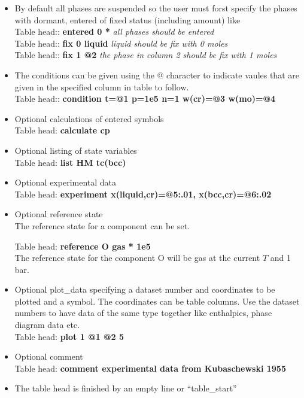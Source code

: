 \documentclass[12pt]{article}
\begin{document}
\begin{itemize}
\item By default all phases are suspended so the user must forst specify the
  phases with dormant, entered of fixed status (including amount) like\\
  Table head:: {\bf entered 0 *} {\em all phases should be entered}\\ 
  Table head:: {\bf fix 0 liquid} {\em liquid should be fix with 0 moles}\\ 
  Table head:: {\bf fix 1 @2} {\em the phase in column 2 should be fix
    with 1 moles}

\item The conditions can be given using the @ character to indicate vaules
  that are given in the specified column in table to follow.\\
  Table head:: {\bf condition t=@1 p=1e5 n=1 w(cr)=@3 w(mo)=@4 }

\item Optional calculations of entered symbols\\
  Table head: {\bf calculate cp}

\item Optional listing of state variables\\
  Table head: {\bf list HM tc(bcc)}

\item Optional experimental data\\
  Table head: {\bf experiment x(liquid,cr)=@5:.01, x(bcc,cr)=@6:.02}
      
\item Optional reference state\\
  The reference state for a component can be set.

  Table head: {\bf reference O gas * 1e5}\\ 
  The reference state for the component O will be gas at the current
  $T$ and 1 bar.

\item Optional plot\_data specifying a dataset number and coordinates
  to be plotted and a symbol.  The coordinates can be table columns.
  Use the dataset numbers to have data of the same type together like
  enthalpies, phase diagram data etc.\\
  Table head: {\bf plot 1 @1 @2 5}

\item Optional comment\\
  Table head: {\bf comment experimental data from Kubaschewski 1955}

\item The table head is finished by an empty line or ``table\_start''
\end{itemize}
  
\end{document}
